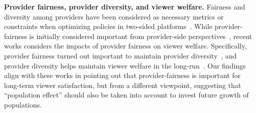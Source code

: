 \textbf{Provider fairness, provider diversity, and viewer welfare.}
Fairness and diversity among providers have been considered as necessary metrics or constraints when optimizing policies in two-sided platforms~\citep{singh2018fairness, wang2021user, boutilier2023modeling}. While provider-fairness is initially considered important from provider-side perspectives~\citep{singh2018fairness}, recent works considers the impacts of provider fairness on viewer welfare. Specifically, provider fairness turned out important to maintain provider diversity~\citep{yao2023rethinking, hron2022modeling}, and provider diversity helps maintain viewer welfare in the long-run~\citep{su2023value, mladenov2020optimizing}. Our findings align with these works in pointing out that provider-fairness is important for long-term viewer satisfaction, but from a different viewpoint, suggesting that ``population effect'' should also be taken into account to invest future growth of populations.